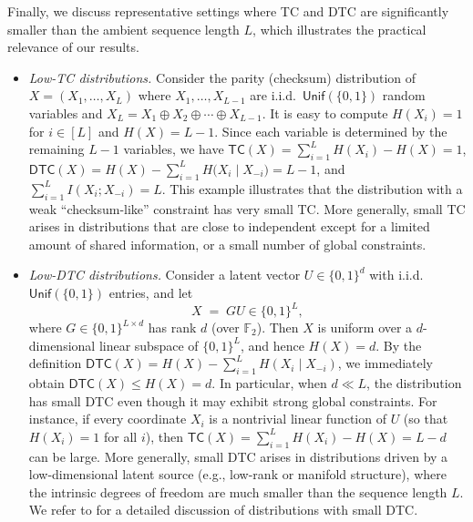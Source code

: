 \documentclass[english]{article}
\newcommand{\TC}{\mathsf{TC}}
\newcommand{\DTC}{\mathsf{DTC}}
\begin{document}
Finally, we discuss representative settings where TC and DTC are significantly smaller than the ambient sequence length $L$, which illustrates the practical relevance of our results.
\begin{itemize}
    \item \textit{Low-TC distributions.}    
Consider the parity (checksum) distribution of $X= (X_1,\dots,X_L)$ where $X_1,\dots,X_{L-1}$ are i.i.d.~$\mathsf{Unif}(\{0,1\})$ random variables and
$X_L = X_1 \oplus X_2 \oplus \cdots \oplus X_{L-1}$. 
It is easy to compute $H(X_i) = 1$ for $i\in[L]$ and $H(X)=L-1$. 
Since each variable is determined by the remaining $L-1$ variables, we have
$\TC(X)=\sum_{i=1}^L H(X_i)-H(X)=1$, $\DTC(X) = H(X) - \sum_{i=1}^L H\big(X_i \mid X_{-i}\big) = L-1$, and $\sum_{i=1}^L I(X_i; X_{-i}) = L$.
This example illustrates that the distribution with a weak ``checksum-like'' constraint has very small TC.
More generally, small TC arises in distributions that are close to independent except for a limited amount of shared information, or a small number of global constraints.

\item \textit{Low-DTC distributions.}
Consider a latent vector $U\in\{0,1\}^d$ with i.i.d.\ $\mathsf{Unif}(\{0,1\})$ entries, and let
\[
X \;=\; G U \in \{0,1\}^L,
\]
where $G\in\{0,1\}^{L\times d}$ has rank $d$ (over $\mathbb{F}_2$). Then $X$ is uniform over a
$d$-dimensional linear subspace of $\{0,1\}^L$, and hence $H(X)=d$. By the definition
$\DTC(X)= H(X)-\sum_{i=1}^L H(X_i\mid X_{-i})$, we immediately obtain
$
\DTC(X)\le H(X)=d.
$
In particular, when $d\ll L$, the distribution has small DTC even though it may exhibit strong
global constraints. For instance, if every coordinate $X_i$ is a nontrivial linear function of $U$
(so that $H(X_i)=1$ for all $i$), then
$
\TC(X)=\sum_{i=1}^L H(X_i)-H(X)=L-d
$
can be large. More generally, small DTC arises in distributions driven by a low-dimensional latent source (e.g., low-rank or manifold structure), where the intrinsic degrees of freedom are much smaller than the sequence length $L$.
We refer to \citet{dmitriev2026efficient} for a detailed discussion of distributions with small DTC.

\end{itemize}
\end{document}
